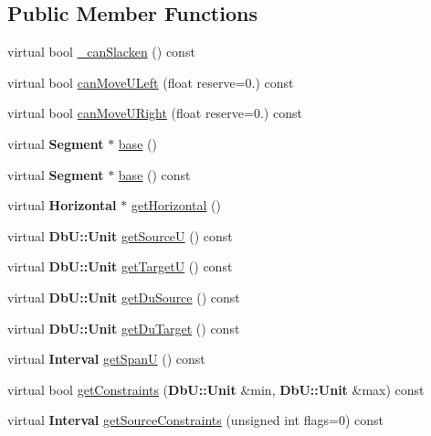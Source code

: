 \subsection*{Public Member Functions}
\begin{DoxyCompactItemize}
\item 
virtual bool \hyperlink{classKatabatic_1_1AutoHorizontal_ab0c6fe24404afe19268a7b796fa74bec}{\-\_\-can\-Slacken} () const 
\item 
virtual bool \hyperlink{classKatabatic_1_1AutoHorizontal_aa9e85f38a842d1966eb72afccb446676}{can\-Move\-U\-Left} (float reserve=0.) const 
\item 
virtual bool \hyperlink{classKatabatic_1_1AutoHorizontal_a7559a856712400a9325665842e0bcd64}{can\-Move\-U\-Right} (float reserve=0.) const 
\item 
virtual {\bf Segment} $\ast$ \hyperlink{classKatabatic_1_1AutoHorizontal_a9e651c17b47f82166a02865c9296a2df}{base} ()
\item 
virtual {\bf Segment} $\ast$ \hyperlink{classKatabatic_1_1AutoHorizontal_adcd751c3ec393fabdef5ede0ffff6f2d}{base} () const 
\item 
virtual {\bf Horizontal} $\ast$ \hyperlink{classKatabatic_1_1AutoHorizontal_a659b8ed90de679564924afe07af478de}{get\-Horizontal} ()
\item 
virtual {\bf Db\-U\-::\-Unit} \hyperlink{classKatabatic_1_1AutoHorizontal_a3932d5ce9094ead510e4e33bd4e78e1a}{get\-Source\-U} () const 
\item 
virtual {\bf Db\-U\-::\-Unit} \hyperlink{classKatabatic_1_1AutoHorizontal_a8e5f2a51f56c6bdb74024ac77c08a22a}{get\-Target\-U} () const 
\item 
virtual {\bf Db\-U\-::\-Unit} \hyperlink{classKatabatic_1_1AutoHorizontal_a44998a5f0d71597006fe4f3ffed8e3d1}{get\-Du\-Source} () const 
\item 
virtual {\bf Db\-U\-::\-Unit} \hyperlink{classKatabatic_1_1AutoHorizontal_a4f505a59109fc6087696f483ccc7f9dc}{get\-Du\-Target} () const 
\item 
virtual {\bf Interval} \hyperlink{classKatabatic_1_1AutoHorizontal_a9409a4b64c21fa8b1517149728f0a4c1}{get\-Span\-U} () const 
\item 
virtual bool \hyperlink{classKatabatic_1_1AutoHorizontal_aff207f4cc3c3682ed57369fdfe157d2d}{get\-Constraints} ({\bf Db\-U\-::\-Unit} \&min, {\bf Db\-U\-::\-Unit} \&max) const 
\item 
virtual {\bf Interval} \hyperlink{classKatabatic_1_1AutoHorizontal_a3c24695921b612a57c5ac60ff0aa3878}{get\-Source\-Constraints} (unsigned int flags=0) const 

\end{DoxyCompactItemize}
